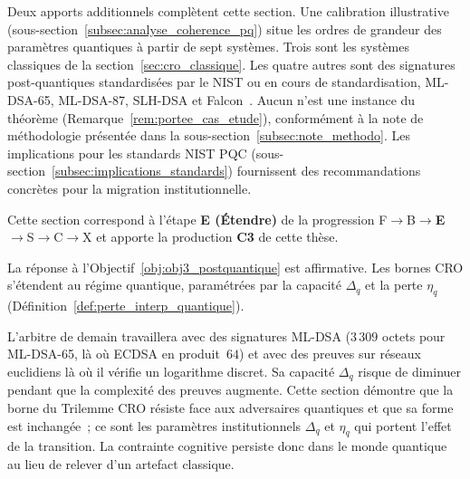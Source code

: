 \begin{sloppypar}
Deux apports additionnels compl\`etent cette section. Une calibration
illustrative (sous-section~\ref{subsec:analyse_coherence_pq}) situe les ordres de
grandeur des param\`etres quantiques \`a partir de sept syst\`emes. Trois sont les syst\`emes classiques de la
section~\ref{sec:cro_classique}. Les quatre autres sont des signatures post-quantiques
standardis\'ees par le NIST ou en cours de standardisation, ML-DSA-65, ML-DSA-87, SLH-DSA
et Falcon~\cite{Dilithium2022,SPHINCS2022,Falcon2022}. Aucun n'est une
instance du th\'eor\`eme (Remarque~\ref{rem:portee_cas_etude}), conform\'ement
\`a la note de m\'ethodologie pr\'esent\'ee dans la sous-section~\ref{subsec:note_methodo}.
Les implications pour les standards NIST PQC
(sous-section~\ref{subsec:implications_standards}) fournissent des
recommandations concr\`etes pour la migration institutionnelle.

Cette section correspond \`a l'\'etape \textbf{E (\'Etendre)} de la progression
F$\to$B$\to$\textbf{E}$\to$S$\to$C$\to$X et apporte la production \textbf{C3} de
cette th\`ese.

La r\'eponse \`a l'Objectif~\ref{obj:obj3_postquantique} est affirmative. Les
bornes CRO s'\'etendent au r\'egime quantique, param\'etr\'ees par la capacit\'e
$\Delta_q$ et la perte $\eta_q$ (D\'efinition~\ref{def:perte_interp_quantique}).
\end{sloppypar}

\begin{boiteArbitre}
L'arbitre de demain travaillera avec des signatures ML-DSA ($3\,309$
octets pour ML-DSA-65, l\`a o\`u ECDSA en produit~$64$) et avec des preuves sur r\'eseaux
euclidiens l\`a o\`u il v\'erifie un logarithme discret. Sa capacit\'e
$\Delta_q$ risque de diminuer pendant que la complexit\'e des preuves augmente.
Cette section d\'emontre que la borne du Trilemme CRO r\'esiste face aux
adversaires quantiques et que sa forme est inchang\'ee~; ce sont les
param\`etres institutionnels $\Delta_q$ et $\eta_q$ qui portent l'effet de la
transition. La contrainte cognitive persiste donc dans le monde quantique au lieu
de relever d'un artefact classique.
\end{boiteArbitre}

